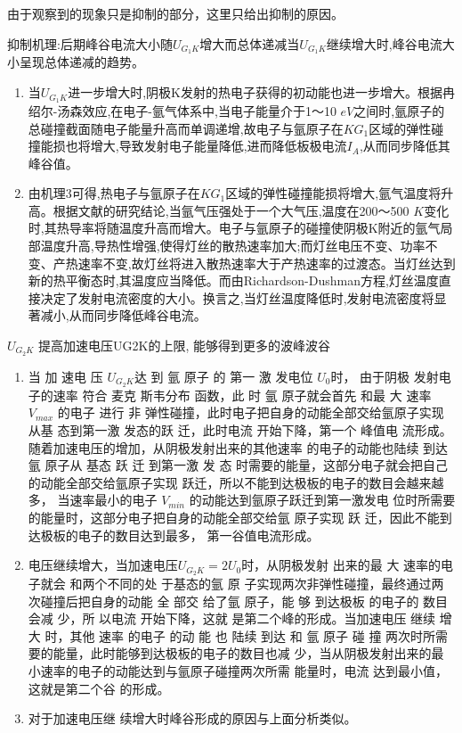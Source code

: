 \documentclass[a4paper,UTF8]{ctexart}
\begin{document}
\begin{framed}

由于观察到的现象只是抑制的部分，这里只给出抑制的原因。

抑制机理:后期峰谷电流大小随$U_{G_{1}K}$增大而总体递减当$U_{G_{1}K}$继续增大时,峰谷电流大小呈现总体递减的趋势。

\begin{enumerate}
    \item 当$U_{G_{1}K}$进一步增大时,阴极K发射的热电子获得的初动能也进一步增大。根据冉绍尔-汤森效应,在电子-氩气体系中,当电子能量介于1～10 $eV$之间时,氩原子的总碰撞截面随电子能量升高而单调递增,故电子与氩原子在$KG_{1}$区域的弹性碰撞能损也将增大,导致发射电子能量降低,进而降低板极电流$I_{A}$,从而同步降低其峰谷值。
    \item 由机理3可得,热电子与氩原子在$KG_1$区域的弹性碰撞能损将增大,氩气温度将升高。根据文献的研究结论,当氩气压强处于一个大气压,温度在200～500 $K$变化时,其热导率将随温度升高而增大。电子与氩原子的碰撞使阴极K附近的氩气局部温度升高,导热性增强,使得灯丝的散热速率加大;而灯丝电压不变、功率不变、产热速率不变,故灯丝将进入散热速率大于产热速率的过渡态。当灯丝达到新的热平衡态时,其温度应当降低。而由Richardson-Dushman方程,灯丝温度直接决定了发射电流密度的大小。换言之,当灯丝温度降低时,发射电流密度将显著减小,从而同步降低峰谷电流。
\end{enumerate}    
\end{framed}

{\uppercase\expandafter{} \bfseries $U_{G_{2}K}$} 提高加速电压UG2K的上限, 能够得到更多的波峰波谷\cite{U2}

\begin{framed}
\begin{enumerate}
    \item 当 加 速电 压 $U_{G_{2}K}$达 到 氩 原子 的 第一 激 发电位 $U_0$时，
    由于阴极 发射电子的速率 符合 麦克 斯韦分布
函数，此 时 氩 原子就会首先 和最 大 速率 $V_{max}$ 的电子 进行 非
弹性碰撞，此时电子把自身的动能全部交给氩原子实现从基
态到第一激 发态的跃 迁，此时电流 开始下降，第一个 峰值电
流形成。随着加速电压的增加，从阴极发射出来的其他速率
的电子的动能也陆续 到达氩 原子从 基态 跃 迁 到第一激 发 态
时需要的能量，这部分电子就会把自己的动能全部交给氩原子实现 跃迁，所以不能到达极板的电子的数目会越来越多，
当速率最小的电子 $V_{min}$ 的动能达到氩原子跃迁到第一激发电
位时所需要的能量时，这部分电子把自身的动能全部交给氩
原子实现 跃 迁，因此不能到达极板的电子的数目达到最多，
第一谷值电流形成。
    \item 电压继续增大，当加速电压$U_{G_{2}K}=2U_0$时，从阴极发射
出来的最 大 速率的电子就会 和两个不同的处 于基态的氩 原
子实现两次非弹性碰撞，最终通过两次碰撞后把自身的动能
全 部交 给了氩 原子，能 够 到达极板 的电子的 数目会减 少，所
以电流 开始下降，这就 是第二个峰的形成。当加速电压 继续
增 大 时，其他 速率 的电子 的动 能 也 陆续 到达 和 氩 原子 碰 撞
两次时所需要的能量，此时能够到达极板的电子的数目也减
少，当从阴极发射出来的最小速率的电子的动能达到与氩原子碰撞两次所需 能量时，电流 达到最小值，这就是第二个谷
的形成。
    \item 对于加速电压继
续增大时峰谷形成的原因与上面分析类似。
\end{enumerate}    
\end{framed}
\end{document}
